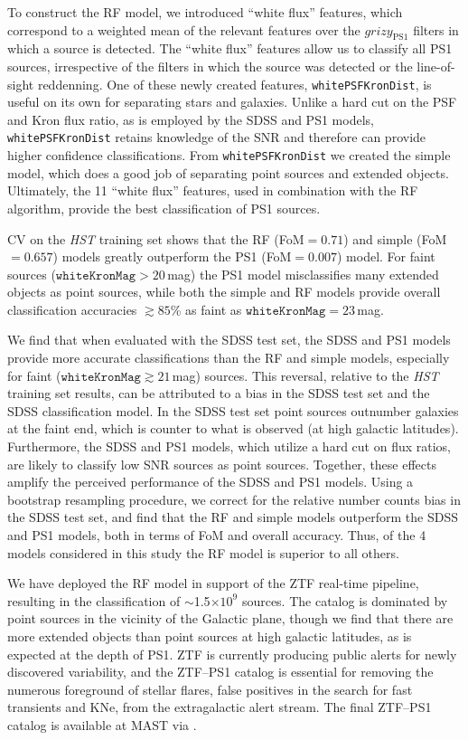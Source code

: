 \documentclass[twocolumn, dvipdfmx]{aastex62}
\begin{document}
\begin{CJK*}{UTF8}{gbsn}
To construct the RF model, we introduced ``white flux'' features, which
correspond to a weighted mean of the relevant features over the
$grizy_{\mathrm {PS1}}$ filters in which a source is detected. The ``white
flux'' features allow us to classify all PS1 sources, irrespective of the
filters in which the source was detected or the line-of-sight reddenning.
One of these newly created features, \texttt{whitePSFKronDist}, is useful on
its own for separating stars and galaxies. Unlike a hard cut on the PSF and
Kron flux ratio, as is employed by the SDSS and PS1 models,
\texttt{whitePSFKronDist} retains knowledge of the SNR and therefore can
provide higher confidence classifications. From \texttt{whitePSFKronDist} we
created the simple model, which does a good job of separating point sources
and extended objects. Ultimately, the 11 ``white flux'' features, used in
combination with the RF algorithm, provide the best classification of PS1
sources.

CV on the \textit{HST} training set shows that the RF (FoM$ = 0.71$) and
simple (FoM$ = 0.657$) models greatly outperform the PS1 (FoM$ = 0.007$)
model. For faint sources ($\mathtt{whiteKronMag} > 20$\,mag) the PS1 model
misclassifies many extended objects as point sources, while both the simple
and RF models provide overall classification accuracies $\gtrsim 85$\% as
faint as $\mathtt{whiteKronMag} = 23$\,mag.

We find that when evaluated with the SDSS test set, the SDSS and PS1 models
provide more accurate classifications than the RF and simple models,
especially for faint ($\mathtt{whiteKronMag} \gtrsim 21$\,mag) sources. This
reversal, relative to the \textit{HST} training set results, can be
attributed to a bias in the SDSS test set and the SDSS classification model.
In the SDSS test set point sources outnumber galaxies at the faint end,
which is counter to what is observed (at high galactic latitudes).
Furthermore, the SDSS and PS1 models, which utilize a hard cut on flux
ratios, are likely to classify low SNR sources as point sources. Together,
these effects amplify the perceived performance of the SDSS and PS1 models.
Using a bootstrap resampling procedure, we correct for the relative number
counts bias in the SDSS test set, and find that the RF and simple models
outperform the SDSS and PS1 models, both in terms of FoM and overall
accuracy. Thus, of the 4 models considered in this study the RF model is
superior to all others.

We have deployed the RF model in support of the ZTF real-time pipeline,
resulting in the classification of $\sim$1.5$\times 10^{9}$ sources. The
catalog is dominated by point sources in the vicinity of the Galactic plane,
though we find that there are more extended objects than point sources at
high galactic latitudes, as is expected at the depth of PS1. ZTF is
currently producing public alerts for newly discovered variability, and the
ZTF--PS1 catalog is essential for removing the numerous foreground of
stellar flares, false positives in the search for fast transients and KNe,
from the extragalactic alert stream. 
The final ZTF--PS1 catalog is available at MAST 
via .


\end{CJK*}
\end{document}
